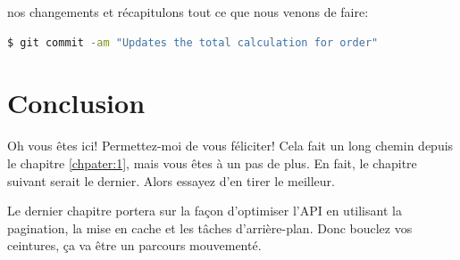 \documentclass[]{report}
\begin{document}
     nos changements et récapitulons tout ce que nous venons de faire:

    \begin{scriptsize}
      \begin{lstlisting}[language=bash]
      $ git commit -am "Updates the total calculation for order"
      \end{lstlisting}
    \end{scriptsize}

  \section{Conclusion}

    Oh vous êtes ici! Permettez-moi de vous féliciter! Cela fait un long chemin depuis le chapitre \ref{chpater:1}, mais vous êtes à un pas de plus. En fait, le chapitre suivant serait le dernier. Alors essayez d'en tirer le meilleur.

    Le dernier chapitre portera sur la façon d'optimiser l'API en utilisant la pagination, la mise en cache et les tâches d'arrière-plan. Donc bouclez vos ceintures, ça va être un parcours mouvementé.
\end{document}
